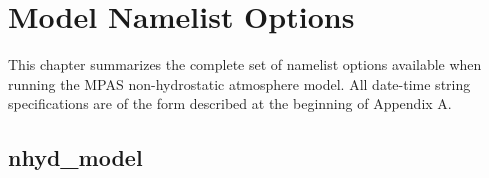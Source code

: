 
\chapter{Model Namelist Options}
\label{chap:atm_namelist}

This chapter summarizes the complete set of namelist options available when running the MPAS non-hydrostatic atmosphere model.
All date-time string specifications are of the form described at the beginning of Appendix A.

\section{nhyd\_model}

